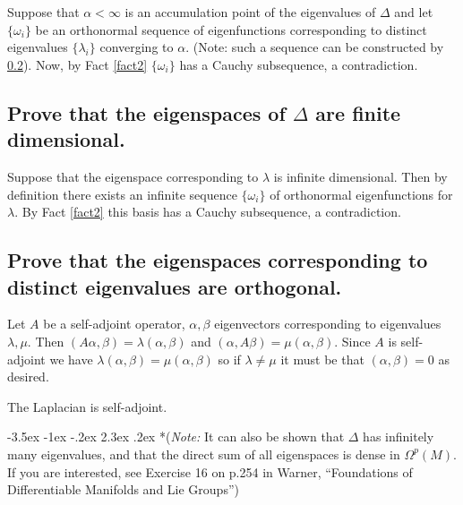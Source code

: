 \documentclass[10pt]{article}
\makeatletter
\renewcommand\section{\@startsection{section}{1}{\z@}%
                                  {-3.5ex \@plus -1ex \@minus -.2ex}%
                                  {2.3ex \@plus.2ex}%
                                  {\normalfont\large\bfseries}}
\DeclareMathOperator{\2}{II}
\newcommand{\note}[1]{{(\emph{Note:} #1)}} %
\makeatother
\begin{document}
Suppose that $\alpha < \infty$ is an accumulation point of the eigenvalues of $\Delta$ and let $\{ \omega_i \}$ be an orthonormal sequence of eigenfunctions corresponding to distinct eigenvalues $\{\lambda_i\}$ converging to $\alpha$. (Note: such a sequence can be constructed by \ref{orthog}). Now, by Fact \ref{fact2} $\{\omega_i \}$ has a Cauchy subsequence, a contradiction.

\subsection{Prove that the eigenspaces of $\Delta$ are finite dimensional.}
Suppose that the eigenspace corresponding to $\lambda$ is infinite dimensional. Then by definition there exists an infinite sequence $\{ \omega_i \}$ of orthonormal eigenfunctions for $\lambda$. By Fact \ref{fact2} this basis has a Cauchy subsequence, a contradiction.

\subsection{Prove that the eigenspaces corresponding to distinct eigenvalues are orthogonal.}\label{orthog}
Let $A$ be a self-adjoint operator, $\alpha, \beta$ eigenvectors corresponding to eigenvalues $\lambda, \mu$. Then $(A \alpha, \beta) = \lambda ( \alpha, \beta)$ and $(\alpha, A \beta) = \mu (\alpha, \beta)$. Since $A$ is self-adjoint we have $\lambda(\alpha, \beta) = \mu(\alpha, \beta)$ so if $\lambda \neq \mu$ it must be that  $(\alpha, \beta)=0$ as desired. 

The Laplacian is self-adjoint.

\section*{\note{It can also be shown that $\Delta$ has infinitely many eigenvalues, and that the direct sum of all eigenspaces is dense in $\Omega^p(M)$. If you are interested, see Exercise 16 on p.254 in Warner, ``Foundations of Differentiable Manifolds and Lie Groups''}}
\end{document}

